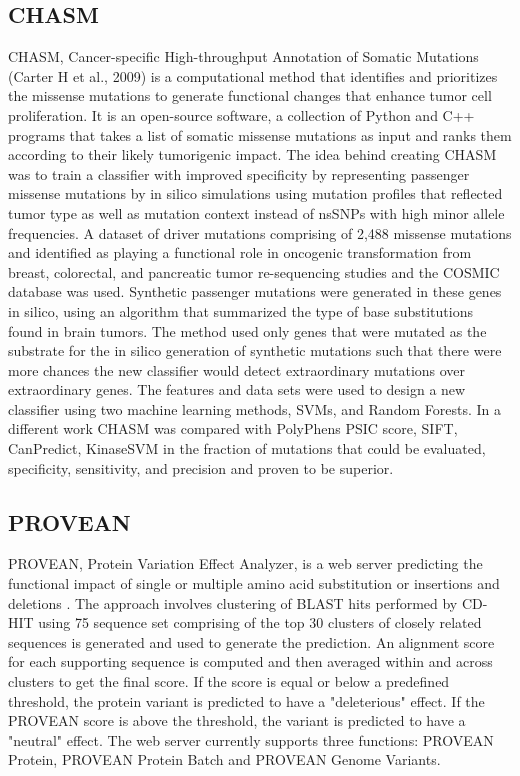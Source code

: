 \documentclass[10pt,letterpaper]{article}
\begin{document}
\subsection{CHASM}

CHASM, Cancer-specific High-throughput Annotation of Somatic Mutations
(Carter H et al., 2009) is a computational method that identifies and
prioritizes the missense mutations to generate functional changes that
enhance tumor cell proliferation. It is an open-source software, a
collection of Python and C++ programs that takes a list of somatic
missense mutations as input and ranks them according to their likely
tumorigenic impact. The idea behind creating CHASM was to train a
classifier with improved specificity by representing passenger
missense mutations by in silico simulations using mutation profiles
that reflected tumor type as well as mutation context instead of
nsSNPs with high minor allele frequencies. A dataset of driver
mutations comprising of 2,488 missense mutations and identified as
playing a functional role in oncogenic transformation from breast,
colorectal, and pancreatic tumor re-sequencing studies and the COSMIC
database was used. Synthetic passenger mutations were generated in
these genes in silico, using an algorithm that summarized the type of
base substitutions found in brain tumors. The method used only genes
that were mutated as the substrate for the in silico generation of
synthetic mutations such that there were more chances the new
classifier would detect extraordinary mutations over extraordinary
genes. The features and data sets were used to design a new classifier
using two machine learning methods, SVMs, and Random Forests. In a
different work CHASM was compared with PolyPhens PSIC score, SIFT,
CanPredict, KinaseSVM in the fraction of mutations that could be
evaluated, specificity, sensitivity, and precision and proven to be
superior.

\subsection{PROVEAN}

PROVEAN, Protein Variation Effect Analyzer, is a
web server predicting the functional impact of single or multiple
amino acid substitution or insertions and deletions
\cite{Choi2012-tk}. The approach involves clustering of BLAST hits
performed by CD-HIT using 75%
sequence set comprising of the top 30 clusters of closely related
sequences is generated and used to generate the prediction. An
alignment score for each supporting sequence is computed and then
averaged within and across clusters to get the final score. If the
score is equal or below a predefined threshold, the protein variant is
predicted to have a "deleterious" effect. If the PROVEAN score is
above the threshold, the variant is predicted to have a "neutral"
effect. The web server currently supports three functions: PROVEAN
Protein, PROVEAN Protein Batch and PROVEAN Genome Variants.
\end{document}
